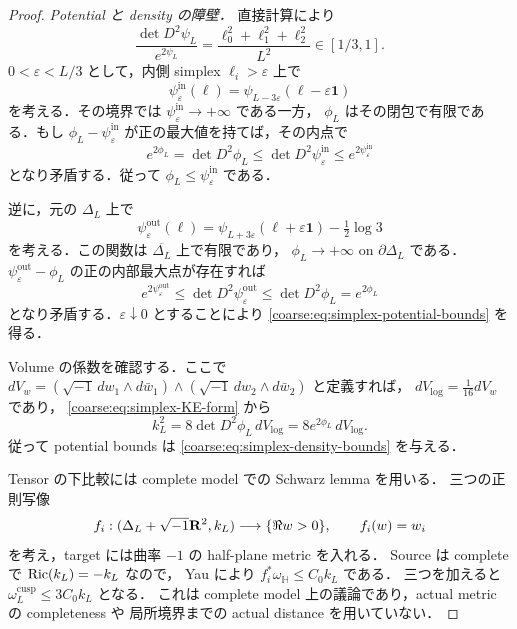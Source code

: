 \begin{proof}
\emph{Potential と density の障壁．}
直接計算により
\begin{equation}\label{coarse:eq:simplex-barrier-determinant}
 \frac{\det D^2\psi_L}{e^{2\psi_L}}
   =\frac{\ell_0^2+\ell_1^2+\ell_2^2}{L^2}
   \in[1/3,1].
\end{equation}
$0<\varepsilon<L/3$ として，内側 simplex $\ell_i>\varepsilon$ 上で
\[
 \psi^{\mathrm{in}}_\varepsilon(\ell)
 =\psi_{L-3\varepsilon}(\ell-\varepsilon\mathbf1)
\]
を考える．その境界では $\psi^{\mathrm{in}}_\varepsilon\to+\infty$ である一方，
$\phi_L$ はその閉包で有限である．もし
$\phi_L-\psi^{\mathrm{in}}_\varepsilon$ が正の最大値を持てば，その内点で
\[
 e^{2\phi_L}=\det D^2\phi_L
 \le\det D^2\psi^{\mathrm{in}}_\varepsilon
 \le e^{2\psi^{\mathrm{in}}_\varepsilon}
\]
となり矛盾する．従って $\phi_L\le\psi^{\mathrm{in}}_\varepsilon$ である．

逆に，元の $\Delta_L$ 上で
\[
 \psi^{\mathrm{out}}_\varepsilon(\ell)
 =\psi_{L+3\varepsilon}(\ell+\varepsilon\mathbf1)
   -\tfrac12\log3
\]
を考える．この関数は $\overline{\Delta_L}$ 上で有限であり，
$\phi_L\to+\infty$ on $\partial\Delta_L$ である．
$\psi^{\mathrm{out}}_\varepsilon-\phi_L$ の正の内部最大点が存在すれば
\[
 e^{2\psi^{\mathrm{out}}_\varepsilon}
 \le\det D^2\psi^{\mathrm{out}}_\varepsilon
 \le\det D^2\phi_L=e^{2\phi_L}
\]
となり矛盾する．$\varepsilon\downarrow0$ とすることにより
\eqref{coarse:eq:simplex-potential-bounds} を得る．

Volume の係数を確認する．ここで
$dV_w=(\sqrt{-1}\,dw_1\wedge d\bar w_1)
\wedge(\sqrt{-1}\,dw_2\wedge d\bar w_2)$ と定義すれば，
$dV_{\log}=\tfrac1{16}dV_w$ であり，
\eqref{coarse:eq:simplex-KE-form} から
\begin{equation}\label{coarse:eq:simplex-volume-normalization}
 k_L^2=8\det D^2\phi_L\,dV_{\log}
      =8e^{2\phi_L}\,dV_{\log}.
\end{equation}
従って potential bounds は \eqref{coarse:eq:simplex-density-bounds} を与える．

Tensor の下比較には complete model での Schwarz lemma を用いる．
三つの正則写像
\[
 f_i:(\Delta_L+\sqrt{-1}\mathbf R^2,k_L)
      \longrightarrow\{\Re w>0\},\qquad f_i(w)=w_i
\]
を考え，target には曲率 $-1$ の half-plane metric を入れる．
Source は complete で $\operatorname{Ric}(k_L)=-k_L$ なので，
Yau\cite[Theorem~2]{YauSchwarzThm2} により
$f_i^*\omega_{\mathbb H}\le C_0 k_L$ である．
三つを加えると $\omega_L^{\mathrm{cusp}}\le3C_0 k_L$ となる．
これは complete model 上の議論であり，actual metric の completeness や
局所境界までの actual distance を用いていない．


\end{proof}
